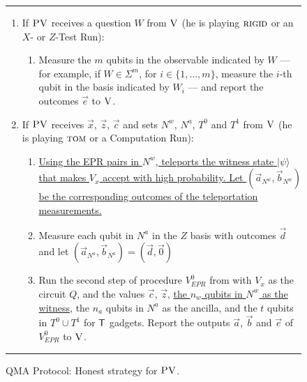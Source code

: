 \documentclass{toc}
\newcommand{\ket}[1]{|#1\rangle}
\newcommand{\rigid}{\textsc{rigid}}
\newcommand{\tom}{\textsc{tom}}
\newcommand{\ver}{\textsc{V}}
\newcommand{\pv}{\textsc{PV}}
\newcommand{\highlight}[1]{\uline{#1}}
\begin{document}
\begin{figure}[H]
\rule[1ex]{\textwidth}{0.5pt}
\vspace{-20pt}
\begin{enumerate}
  \item If $\pv$ receives a question ${W}$ from $\ver$ (he is playing $\rigid$ or an $X$- or $Z$-Test Run):
\begin{enumerate}
     \item[]  Measure the $m$ qubits in the observable indicated by $W$ --- for example, if $W\in \Sigma^m$, for $i\in \{1,\ldots,m\}$, measure the $i$-th qubit in the basis indicated by $W_i$ --- and report the outcomes $\vec{e}$ to $\ver$.
\end{enumerate}

  \item If $\pv$ receives $\vec{x}$, $\vec{z}$, $\vec{c}$ and sets $N^w$, $N^a$, $T^0$ and $T^1$ from $\ver$ (he is playing $\tom$ or a Computation Run):
\begin{enumerate}
  \item[] \highlight{Using the EPR pairs in $N^w$, teleports the witness state
    $\ket{\psi}$ that makes $V_x$ accept with high probability. Let $(\vec{a}_{N^w}, \vec{b}_{N^w})$ be the corresponding
    outcomes of the teleportation measurements.}
  \item[] Measure each qubit in $N^a$ in the $Z$ basis with outcomes $\vec{d}$  and let $(\vec{a}_{N^a},
    \vec{b}_{N^a}) = (\vec{d}, \vec{0} )$ 
	\item[] Run the second step of procedure $V_{EPR}^0$ from
 with $V_x$ as the circuit $Q$, and
the
    values $\vec{c}$, $\vec{z}$, \highlight{the $n_w$ qubits in $N^w$ as the witness}, the $n_a$ qubits in 
        $N^a$ as the ancilla, and the $t$ qubits in $T^0\cup T^1$ for $\sf T$ gadgets. Report the outputs  $\vec{a}$, $\vec{b}$ and $\vec{e}$ of $V_{EPR}^0$ to $\ver$.
\end{enumerate}
\end{enumerate}
\rule[2ex]{\textwidth}{0.5pt}\vspace{-.5cm}
\caption{QMA Protocol: Honest strategy for $\pv$.}\label{fig:qma-protocol-PV}
\end{figure}
\end{document}
